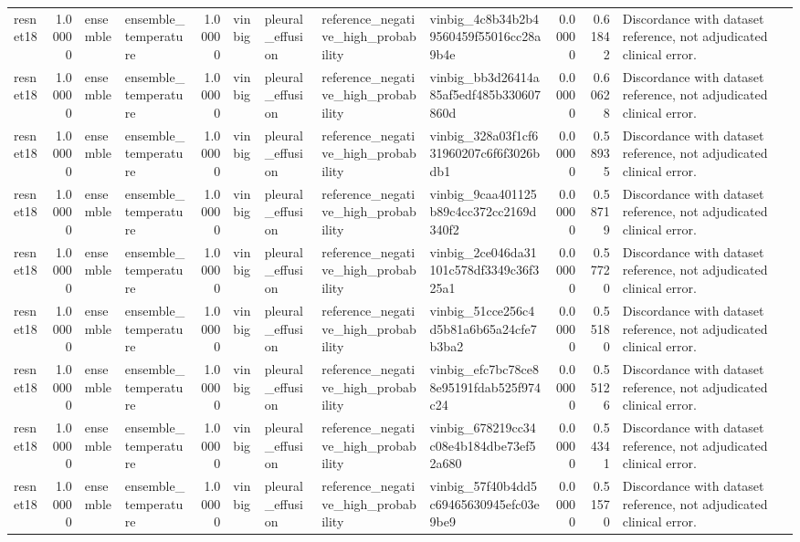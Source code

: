 \begin{tabular}{lrllrllllrrl}
resnet18 & 1.00000 & ensemble & ensemble\_temperature & 1.00000 & vinbig & pleural\_effusion & reference\_negative\_high\_probability & vinbig\_4c8b34b2b49560459f55016cc28a9b4e & 0.00000 & 0.61842 & Discordance with dataset reference, not adjudicated clinical error. \\
resnet18 & 1.00000 & ensemble & ensemble\_temperature & 1.00000 & vinbig & pleural\_effusion & reference\_negative\_high\_probability & vinbig\_bb3d26414a85af5edf485b330607860d & 0.00000 & 0.60628 & Discordance with dataset reference, not adjudicated clinical error. \\
resnet18 & 1.00000 & ensemble & ensemble\_temperature & 1.00000 & vinbig & pleural\_effusion & reference\_negative\_high\_probability & vinbig\_328a03f1cf631960207c6f6f3026bdb1 & 0.00000 & 0.58935 & Discordance with dataset reference, not adjudicated clinical error. \\
resnet18 & 1.00000 & ensemble & ensemble\_temperature & 1.00000 & vinbig & pleural\_effusion & reference\_negative\_high\_probability & vinbig\_9caa401125b89c4cc372cc2169d340f2 & 0.00000 & 0.58719 & Discordance with dataset reference, not adjudicated clinical error. \\
resnet18 & 1.00000 & ensemble & ensemble\_temperature & 1.00000 & vinbig & pleural\_effusion & reference\_negative\_high\_probability & vinbig\_2ce046da31101c578df3349c36f325a1 & 0.00000 & 0.57720 & Discordance with dataset reference, not adjudicated clinical error. \\
resnet18 & 1.00000 & ensemble & ensemble\_temperature & 1.00000 & vinbig & pleural\_effusion & reference\_negative\_high\_probability & vinbig\_51cce256c4d5b81a6b65a24cfe7b3ba2 & 0.00000 & 0.55180 & Discordance with dataset reference, not adjudicated clinical error. \\
resnet18 & 1.00000 & ensemble & ensemble\_temperature & 1.00000 & vinbig & pleural\_effusion & reference\_negative\_high\_probability & vinbig\_efc7bc78ce88e95191fdab525f974c24 & 0.00000 & 0.55126 & Discordance with dataset reference, not adjudicated clinical error. \\
resnet18 & 1.00000 & ensemble & ensemble\_temperature & 1.00000 & vinbig & pleural\_effusion & reference\_negative\_high\_probability & vinbig\_678219cc34c08e4b184dbe73ef52a680 & 0.00000 & 0.54341 & Discordance with dataset reference, not adjudicated clinical error. \\
resnet18 & 1.00000 & ensemble & ensemble\_temperature & 1.00000 & vinbig & pleural\_effusion & reference\_negative\_high\_probability & vinbig\_57f40b4dd5c69465630945efc03e9be9 & 0.00000 & 0.51570 & Discordance with dataset reference, not adjudicated clinical error. \\

\end{tabular}
